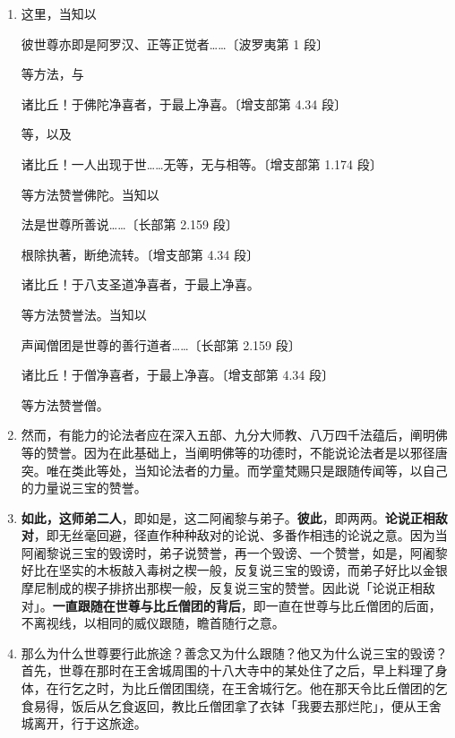 \begin{enumerate}
\item 这里，当知以\begin{quoting}彼世尊亦即是阿罗汉、正等正觉者……{\bluefootnotesize 〔波罗夷第 1 段〕}\end{quoting}等方法，与\begin{quoting}诸比丘！于佛陀净喜者，于最上净喜。{\bluefootnotesize 〔增支部第 4.34 段〕}\end{quoting}等，以及\begin{quoting}诸比丘！一人出现于世……无等，无与相等。{\bluefootnotesize 〔增支部第 1.174 段〕}\end{quoting}等方法赞誉佛陀。当知以\begin{quoting}法是世尊所善说……{\bluefootnotesize 〔长部第 2.159 段〕}\end{quoting}\begin{quoting}根除执著，断绝流转。{\bluefootnotesize 〔增支部第 4.34 段〕}\end{quoting}\begin{quoting}诸比丘！于八支圣道净喜者，于最上净喜。\end{quoting}等方法赞誉法。当知以\begin{quoting}声闻僧团是世尊的善行道者……{\bluefootnotesize 〔长部第 2.159 段〕}\end{quoting}\begin{quoting}诸比丘！于僧净喜者，于最上净喜。{\bluefootnotesize 〔增支部第 4.34 段〕}\end{quoting}等方法赞誉僧。
\item 然而，有能力的论法者应在深入五部、九分大师教、八万四千法蕴后，阐明佛等的赞誉。因为在此基础上，当阐明佛等的功德时，不能说论法者是以邪径唐突。唯在类此等处，当知论法者的力量。而学童梵赐只是跟随传闻等，以自己的力量说三宝的赞誉。
\item \textbf{如此，这师弟二人}，即如是，这二阿阇黎与弟子。\textbf{彼此}，即两两。\textbf{论说正相敌对}，即无丝毫回避，径直作种种敌对的论说、多番作相违的论说之意。因为当阿阇黎说三宝的毁谤时，弟子说赞誉，再一个毁谤、一个赞誉，如是，阿阇黎好比在坚实的木板敲入毒树之楔一般，反复说三宝的毁谤，而弟子好比以金银摩尼制成的楔子排挤出那楔一般，反复说三宝的赞誉。因此说「论说正相敌对」。\textbf{一直跟随在世尊与比丘僧团的背后}，即一直在世尊与比丘僧团的后面，不离视线，以相同的威仪跟随，瞻首随行之意。
\item 那么为什么世尊要行此旅途？善念又为什么跟随？他又为什么说三宝的毁谤？首先，世尊在那时在王舍城周围的十八大寺中的某处住了之后，早上料理了身体，在行乞之时，为比丘僧团围绕，在王舍城行乞。他在那天令比丘僧团的乞食易得，饭后从乞食返回，教比丘僧团拿了衣钵「我要去那烂陀」，便从王舍城离开，行于这旅途。

\end{enumerate}
